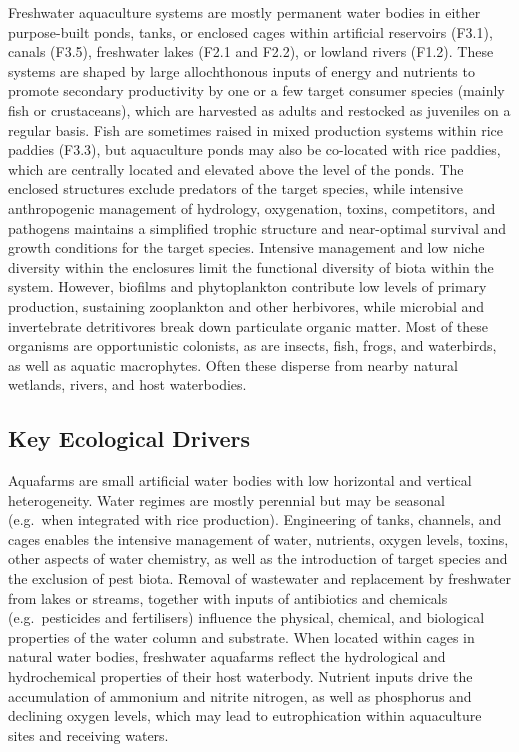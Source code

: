 \documentclass[
  letterpaper,
  DIV=11,
  numbers=noendperiod]{scrartcl}
\begin{document}
Freshwater aquaculture systems are mostly permanent water bodies in
either purpose-built ponds, tanks, or enclosed cages within artificial
reservoirs (F3.1), canals (F3.5), freshwater lakes (F2.1 and F2.2), or
lowland rivers (F1.2). These systems are shaped by large allochthonous
inputs of energy and nutrients to promote secondary productivity by one
or a few target consumer species (mainly fish or crustaceans), which are
harvested as adults and restocked as juveniles on a regular basis. Fish
are sometimes raised in mixed production systems within rice paddies
(F3.3), but aquaculture ponds may also be co-located with rice paddies,
which are centrally located and elevated above the level of the ponds.
The enclosed structures exclude predators of the target species, while
intensive anthropogenic management of hydrology, oxygenation, toxins,
competitors, and pathogens maintains a simplified trophic structure and
near-optimal survival and growth conditions for the target species.
Intensive management and low niche diversity within the enclosures limit
the functional diversity of biota within the system. However, biofilms
and phytoplankton contribute low levels of primary production,
sustaining zooplankton and other herbivores, while microbial and
invertebrate detritivores break down particulate organic matter. Most of
these organisms are opportunistic colonists, as are insects, fish,
frogs, and waterbirds, as well as aquatic macrophytes. Often these
disperse from nearby natural wetlands, rivers, and host waterbodies.

\subsection{Key Ecological Drivers}\label{key-ecological-drivers-129}

Aquafarms are small artificial water bodies with low horizontal and
vertical heterogeneity. Water regimes are mostly perennial but may be
seasonal (e.g.~when integrated with rice production). Engineering of
tanks, channels, and cages enables the intensive management of water,
nutrients, oxygen levels, toxins, other aspects of water chemistry, as
well as the introduction of target species and the exclusion of pest
biota. Removal of wastewater and replacement by freshwater from lakes or
streams, together with inputs of antibiotics and chemicals
(e.g.~pesticides and fertilisers) influence the physical, chemical, and
biological properties of the water column and substrate. When located
within cages in natural water bodies, freshwater aquafarms reflect the
hydrological and hydrochemical properties of their host waterbody.
Nutrient inputs drive the accumulation of ammonium and nitrite nitrogen,
as well as phosphorus and declining oxygen levels, which may lead to
eutrophication within aquaculture sites and receiving waters.
\end{document}
